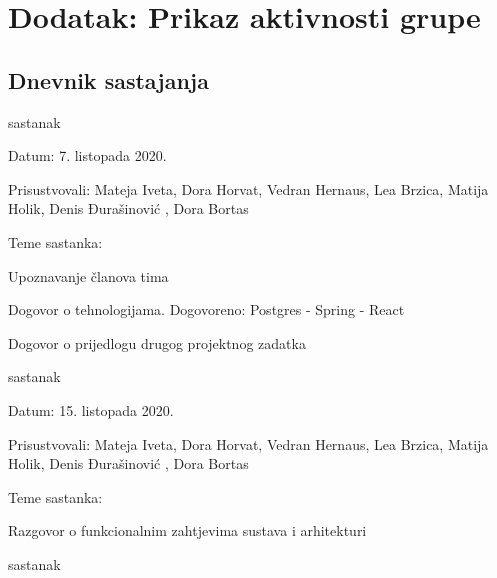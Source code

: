 \chapter*{Dodatak: Prikaz aktivnosti grupe}
		
		\section*{Dnevnik sastajanja}
		
		\begin{packed_enum}
			\item  sastanak
			
			\item[] \begin{packed_item}
				\item Datum: 7. listopada 2020.
				\item Prisustvovali: Mateja Iveta, Dora Horvat, Vedran Hernaus, Lea Brzica, Matija Holik, Denis Đurašinović , Dora Bortas
				\item Teme sastanka:
				\begin{packed_item}
					\item  Upoznavanje članova tima
					\item  Dogovor o tehnologijama. Dogovoreno: Postgres - Spring - React
					\item Dogovor o prijedlogu drugog projektnog zadatka
				\end{packed_item}
			\end{packed_item}
			
			\item  sastanak
			\item[] \begin{packed_item}
				\item Datum: 15. listopada 2020.
				\item Prisustvovali:  Mateja Iveta, Dora Horvat, Vedran Hernaus, Lea Brzica, Matija Holik, Denis Đurašinović , Dora Bortas
				\item Teme sastanka:
				\begin{packed_item}
					\item  Razgovor o funkcionalnim zahtjevima sustava i arhitekturi
					
				\end{packed_item}
			\end{packed_item}
			\item  sastanak
			

\end{packed_enum}
